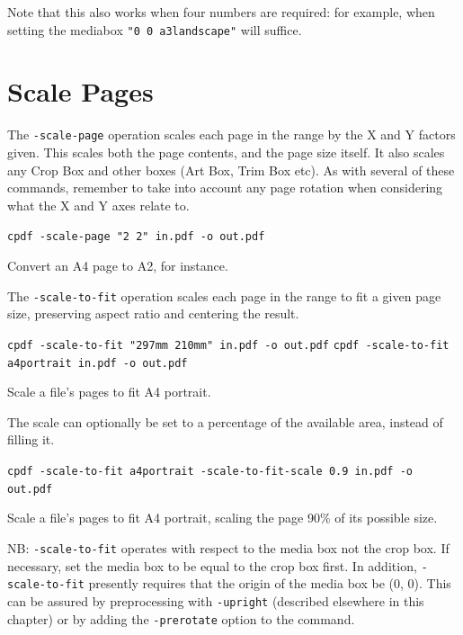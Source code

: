 \documentclass{book}
\begin{document}
\noindent Note that this also works when four numbers are required: for example, when setting the mediabox \texttt{"0 0 a3landscape"} will suffice.

  \section{Scale Pages}
  The \texttt{-scale-page} operation scales each page in the range by the X and
Y factors given. This scales both the page contents, and the page size itself. It also scales any Crop Box and other boxes (Art Box, Trim Box etc). As with several of these commands, remember to take into account any page rotation when considering what the X and Y axes relate to.

  \begin{framed}
  \small\noindent\verb!cpdf -scale-page "2 2" in.pdf -o out.pdf!

  \vspace{2.5mm}
  \noindent Convert an A4 page to A2, for instance.
  \end{framed}

  \noindent The \texttt{-scale-to-fit} operation scales each page in the range to fit a
  given page size, preserving aspect ratio and centering the result.

  \begin{framed}
  \small\noindent\verb!cpdf -scale-to-fit "297mm 210mm" in.pdf -o out.pdf!
  \small\noindent\verb!cpdf -scale-to-fit a4portrait in.pdf -o out.pdf!

  \vspace{2.5mm}
  \noindent Scale a file's pages to fit A4 portrait.
  \end{framed}

  \noindent The scale can optionally be set to a percentage of the available area, instead of filling it.
  \begin{framed}
  \small\noindent\verb!cpdf -scale-to-fit a4portrait -scale-to-fit-scale 0.9 in.pdf -o out.pdf!


  \vspace{2.5mm}
  \noindent Scale a file's pages to fit A4 portrait, scaling the page 90\% of its possible size.
  \end{framed}

\noindent NB: \texttt{-scale-to-fit} operates with respect to the media box not the crop box. If necessary, set the media box to be equal to the crop box first. In addition, \texttt{-scale-to-fit} presently requires that the origin of the media box be (0, 0). This can be assured by preprocessing with \texttt{-upright} (described elsewhere in this chapter) or by adding the \texttt{-prerotate} option to the command.
\end{document}
